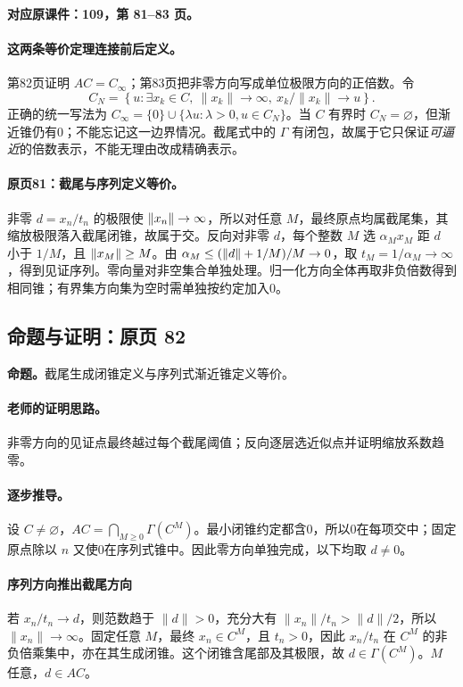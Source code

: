 \textbf{对应原课件：109，第 81--83 页。}


\paragraph{这两条等价定理连接前后定义。}
第82页证明 $AC=C_\infty$；第83页把非零方向写成单位极限方向的正倍数。令
\[C_N=\left\{u:\exists x_k\in C,\ \|x_k\|\to\infty,
\ x_k/\|x_k\|\to u\right\}.
\]
正确的统一写法为 $C_\infty=\{0\}\cup\{\lambda u:\lambda>0,u\in C_N\}$。当 $C$ 有界时 $C_N=\varnothing$，但渐近锥仍有0；不能忘记这一边界情况。截尾式中的 $\Gamma$ 有闭包，故属于它只保证\emph{可逼近}的倍数表示，不能无理由改成精确表示。


\paragraph{原页81：截尾与序列定义等价。}非零 $d=x_n/t_n$ 的极限使 $\left\lVert x_n\right\rVert\to\infty$，所以对任意 $M$，最终原点均属截尾集，其缩放极限落入截尾闭锥，故属于交。反向对非零 $d$，每个整数 $M$ 选 $\alpha_M x_M$ 距 $d$ 小于 $1/M$，且 $\left\lVert x_M\right\rVert\ge M$。由 $\alpha_M\le(\left\lVert d\right\rVert+1/M)/M\to0$，取 $t_M=1/\alpha_M\to\infty$，得到见证序列。零向量对非空集合单独处理。归一化方向全体再取非负倍数得到相同锥；有界集方向集为空时需单独按约定加入0。



\subsection{命题与证明：原页 82}

\textbf{命题。}截尾生成闭锥定义与序列式渐近锥定义等价。

\paragraph{老师的证明思路。}非零方向的见证点最终越过每个截尾阈值；反向逐层选近似点并证明缩放系数趋零。

\paragraph{逐步推导。}
设 $C\ne\varnothing$，$AC=\bigcap_{M\ge0}\Gamma(C^M)$。最小闭锥约定都含0，所以0在每项交中；固定原点除以 $n$ 又使0在序列式锥中。因此零方向单独完成，以下均取 $d\ne0$。
\paragraph{序列方向推出截尾方向}
若 $x_n/t_n\to d$，则范数趋于 $\|d\|>0$，充分大有 $\|x_n\|/t_n>\|d\|/2$，所以 $\|x_n\|\to\infty$。固定任意 $M$，最终 $x_n\in C^M$，且 $t_n>0$，因此 $x_n/t_n$ 在 $C^M$ 的非负倍乘集中，亦在其生成闭锥。这个闭锥含尾部及其极限，故 $d\in\Gamma(C^M)$。$M$ 任意，$d\in AC$。
